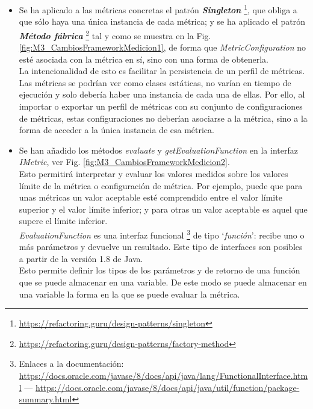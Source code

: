 \begin{itemize}
	\tightlist
	\item Se ha aplicado a las métricas concretas el patrón \textit{\textbf{Singleton}} \footnote{\url{https://refactoring.guru/design-patterns/singleton}}, que obliga a que sólo haya una única instancia de cada métrica; y se ha aplicado el patrón \textit{\textbf{Método fábrica}} \footnote{\url{https://refactoring.guru/design-patterns/factory-method}} tal y como se muestra en la Fig. \ref{fig:M3_CambiosFrameworkMedicion1}, de forma que \textit{MetricConfiguration} no esté asociada con la métrica en sí, sino con una forma de obtenerla.\\
	La intencionalidad de esto es facilitar la persistencia de un perfil de métricas. Las métricas se podrían ver como clases estáticas, no varían en tiempo de ejecución y solo debería haber una instancia de cada una de ellas. Por ello, al importar o exportar un perfil de métricas con su conjunto de configuraciones de métricas, estas configuraciones no deberían asociarse a la métrica, sino a la forma de acceder a la única instancia de esa métrica. 
	\item Se han añadido los métodos \textit{evaluate} y \textit{getEvaluationFunction} en la interfaz \textit{IMetric}, ver Fig. \ref{fig:M3_CambiosFrameworkMedicion2}.\\
	Esto permitirá interpretar y evaluar los valores medidos sobre los valores límite de la métrica o configuración de métrica. Por ejemplo, puede que para unas métricas un valor aceptable esté comprendido entre el valor límite superior y el valor límite inferior; y para otras un valor aceptable es aquel que supere el límite inferior.\\
	\textit{EvaluationFunction} es una interfaz funcional \footnote{Enlaces a la documentación: \url{https://docs.oracle.com/javase/8/docs/api/java/lang/FunctionalInterface.html} --- \url{https://docs.oracle.com/javase/8/docs/api/java/util/function/package-summary.html}} 
	de tipo `\textit{función}': recibe uno o más parámetros y devuelve un resultado. Este tipo de interfaces son posibles a partir de la versión 1.8 de Java.\\
	Esto permite definir los tipos de los parámetros y de retorno de una función que se puede almacenar en una variable. De este modo se puede almacenar en una variable la forma en la que se puede evaluar la métrica.
\end{itemize}


